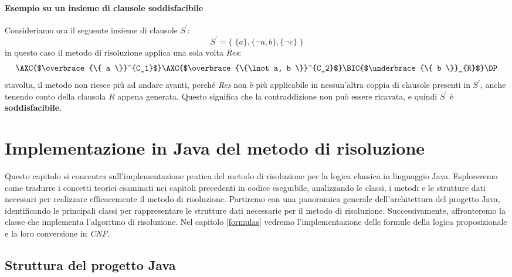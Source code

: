 \documentclass[a4paper,12pt]{report}
\begin{document}
\subsubsection{Esempio su un insieme di clausole soddisfacibile}
Consideriamo ora il seguente insieme di clausole $S^{'}$:
\[ S^{'} = \{ \; \{a\}, \{\lnot a, b\}, \{\lnot c\} \; \} \]
in questo caso il metodo di risoluzione applica una sola volta \emph{Res}:
\[
    \AXC{$\overbrace{\{ a \}}^{C_1}$}
    \AXC{$\overbrace{\{\lnot a, b \}}^{C_2}$}
    \RightLabel{Res}
    \BIC{$\underbrace{\{ b \}}_{R}$}
    \DP
\]
stavolta, il metodo non riesce più ad andare avanti, perché \emph{Res} non è più applicabile in nessun'altra coppia di clausole presenti in $S^{'}$, anche tenendo conto della clausola $R$ appena generata. Questo significa che la contraddizione non può essere ricavata, e quindi $S^{'}$ è \textbf{soddisfacibile}.

% 
% 
\chapter{Implementazione in Java del metodo di risoluzione}
\label{impl}

Questo capitolo si concentra sull'implementazione pratica del metodo di risoluzione per la logica classica in linguaggio Java. Esploreremo come tradurre i concetti teorici esaminati nei capitoli precedenti in codice eseguibile, analizzando le classi, i metodi e le strutture dati necessari per realizzare efficacemente il metodo di risoluzione. Partiremo con una panoramica generale dell'architettura del progetto Java, identificando le principali classi per rappresentare le strutture dati necessarie per il metodo di risoluzione. Successivamente, affronteremo la classe che implementa l'algoritmo di risoluzione. Nel capitolo \ref{formulas} vedremo l'implementazione delle formule della logica proposizionale e la loro conversione in \emph{CNF}.

\section{Struttura del progetto Java}
\label{project_structure}
\end{document}
